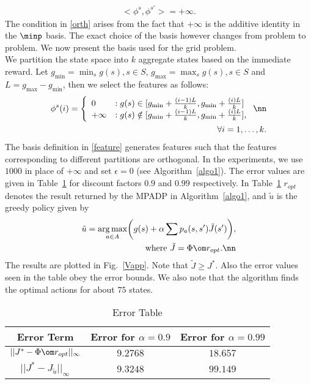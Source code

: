\begin{align}\label{orth}
<\phi^s,\phi^{s'}>=+\infty.
\end{align}
The condition in \eqref{orth} arises from the fact that $+\infty$ is the additive identity in the $\minp$ basis. The exact choice of the basis however changes from problem to problem. We now present the basis used for the grid problem.\\
We partition the state space into $k$ aggregate states based on the immediate reward. Let $g_{\min} = \min_s g(s), s \in S$, $g_{\max}=\max_s g(s), s \in S$ and $L=g_{\max}-g_{\min}$, then we select the features as follows:
\begin{align}\label{feature}
\phi^{s}(i) = \left\{
        \begin{array}{ll}
            0 & : g(s) \in [g_{\min}+\frac{(i-1)L}{k},g_{\min}+\frac{(i)L}{k}] \\
       +\infty & : g(s) \notin [g_{\min}+\frac{(i-1)L}{k},g_{\min}+\frac{(i)L}{k}],
        \end{array}
    \right.\nn\\
\forall  i=1,\ldots,k.
\end{align}
The basis definition in \eqref{feature} generates features such that the features corresponding to different partitions are orthogonal. In the experiments, we use $1000$ in place of $+\infty$ and set $\epsilon=0$ (see Algorithm~\ref{algo1}). 
The error values are given in Table~\ref{errtable} for discount factors $0.9$ and $0.99$ respectively. In Table~\ref{errtable} $r_{opt}$ denotes the result returned by the MPADP in  Algorithm~\ref{algo1}, and $\tilde{u}$ is the greedy policy given by
\begin{align}
\tilde{u}=\underset{a \in A}{\arg\max}\bigg( g(s)+\alpha \sum p_a(s,s')\tilde{J}(s')\bigg), \\\text{where} \mbox{ } \tilde{J}=\Phi\om r_{opt}.\nn
\end{align}
The results are plotted in Fig.~\ref{Vapp}. Note that $\tilde{J}\geq J^*$. Also the error values seen in the table obey the error bounds. We also note that the algorithm finds the optimal actions for about $75$ states.
\begin{table}
\begin{tabular}{|c|c|c|}\hline
Error Term & Error for $\alpha=0.9$ & Error for $\alpha=0.99$\\ \hline
$||J^*-\Phi\om r_{opt}||_\infty$ & $9.2768$ & $18.657$\\ \hline
$||J^*-J_{\tilde{u}}||_\infty$ & $9.3248$ & $99.149$\\ \hline
\end{tabular}
\caption{Error Table}
\label{errtable}
\end{table}

